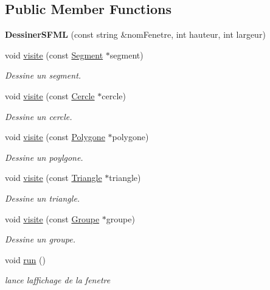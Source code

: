 \subsection*{Public Member Functions}
\begin{DoxyCompactItemize}
\item 
\mbox{\label{class_dessiner_s_f_m_l_a83d131b2368b9ec1fec1c707ce8c42f1}} 
{\bfseries Dessiner\+S\+F\+ML} (const string \&nom\+Fenetre, int hauteur, int largeur)
\item 
void \mbox{\hyperlink{class_dessiner_s_f_m_l_a94dcb5037f1690eea6c38385065a68a8}{visite}} (const \mbox{\hyperlink{class_segment}{Segment}} $\ast$segment)
\begin{DoxyCompactList}\small\item\em Dessine un segment. \end{DoxyCompactList}\item 
void \mbox{\hyperlink{class_dessiner_s_f_m_l_accb8ed59253778163ecd3ca8b37e66de}{visite}} (const \mbox{\hyperlink{class_cercle}{Cercle}} $\ast$cercle)
\begin{DoxyCompactList}\small\item\em Dessine un cercle. \end{DoxyCompactList}\item 
void \mbox{\hyperlink{class_dessiner_s_f_m_l_a8349e760caad82d54bd202d58cdc37fa}{visite}} (const \mbox{\hyperlink{class_polygone}{Polygone}} $\ast$polygone)
\begin{DoxyCompactList}\small\item\em Dessine un poylgone. \end{DoxyCompactList}\item 
void \mbox{\hyperlink{class_dessiner_s_f_m_l_ae06c6ea55ae3fc2f9c230a8639c14108}{visite}} (const \mbox{\hyperlink{class_triangle}{Triangle}} $\ast$triangle)
\begin{DoxyCompactList}\small\item\em Dessine un triangle. \end{DoxyCompactList}\item 
void \mbox{\hyperlink{class_dessiner_s_f_m_l_a7269769a1a0756b590fd5678a179245d}{visite}} (const \mbox{\hyperlink{class_groupe}{Groupe}} $\ast$groupe)
\begin{DoxyCompactList}\small\item\em Dessine un groupe. \end{DoxyCompactList}\item 
\mbox{\label{class_dessiner_s_f_m_l_afe88746b9800a4c79798459559494dd0}} 
void \mbox{\hyperlink{class_dessiner_s_f_m_l_afe88746b9800a4c79798459559494dd0}{run}} ()
\begin{DoxyCompactList}\small\item\em lance l\textquotesingle{}affichage de la fenetre \end{DoxyCompactList}\end{DoxyCompactItemize}
